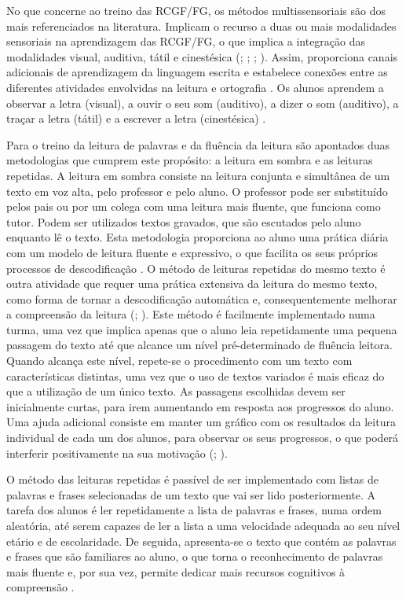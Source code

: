 \documentclass[
  oneside,
  11pt, a4paper,
  footinclude=true,
  headinclude=true,
  cleardoublepage=empty
]{scrbook}
\begin{document}
No que concerne ao treino das RCGF/FG, os métodos multissensoriais são dos mais referenciados na literatura. Implicam o recurso a duas ou mais modalidades sensoriais na aprendizagem das RCGF/FG, o que implica a integração das modalidades visual, auditiva, tátil e cinestésica (\citealp{Bryant}; \citealp{Defior}; \citealp{Outon}; \citealp{Thomson}). Assim, proporciona canais adicionais de aprendizagem da linguagem escrita \citep{Thomson} e estabelece conexões entre as diferentes atividades envolvidas na leitura e ortografia \citep{Bryant}. Os alunos aprendem a observar a letra (visual), a ouvir o seu som (auditivo), a dizer o som (auditivo), a traçar a letra (tátil) e a escrever a letra (cinestésica) \citep{Fletcher}.

Para o treino da leitura de palavras e da fluência da leitura são apontados duas metodologias que cumprem este propósito: a leitura em sombra e as leituras repetidas. A leitura em sombra \citep{Eldredge} consiste na leitura conjunta e simultânea de um texto em voz alta, pelo professor e pelo aluno. O professor pode ser substituído pelos pais ou por um colega com uma leitura mais fluente, que funciona como tutor. Podem ser utilizados textos gravados, que são escutados pelo  aluno  enquanto lê o texto. Esta metodologia proporciona ao aluno uma prática diária com um modelo de leitura fluente e expressivo, o que facilita os seus próprios processos de descodificação \citep{Vidal}. O método de leituras repetidas do mesmo texto é outra atividade que requer  uma  prática  extensiva  da  leitura  do  mesmo  texto, como  forma  de  tornar  a descodificação automática e, consequentemente melhorar a compreensão da leitura (\citealp{Bermejo}; \citealp{Defior}). Este método é facilmente implementado numa turma, uma vez que implica apenas que o aluno leia repetidamente uma pequena passagem do texto até que alcance um nível pré-determinado de fluência leitora. Quando alcança este nível, repete-se o procedimento com um texto com características distintas, uma vez que o uso de textos variados é mais eficaz do que a utilização de um único texto. As  passagens escolhidas devem ser  inicialmente  curtas,  para irem  aumentando  em resposta aos progressos do aluno. Uma ajuda adicional consiste em manter um gráfico com os resultados da leitura individual de cada um dos alunos, para observar os seus progressos, o que poderá interferir positivamente na sua motivação (\citealp{Defior}; \citealp{Vidal}).

O método das leituras repetidas é passível de ser implementado com listas de palavras e frases selecionadas de um texto que vai ser lido posteriormente. A tarefa dos alunos é ler repetidamente a lista de palavras e frases, numa ordem aleatória, até serem capazes de ler a lista a uma velocidade adequada ao seu nível etário e de escolaridade. De seguida, apresenta-se o texto que contém as palavras e frases que são familiares ao aluno, o que torna o reconhecimento de palavras mais fluente e, por sua vez, permite dedicar mais recursos cognitivos à compreensão \citep{Defior}.
\end{document}
